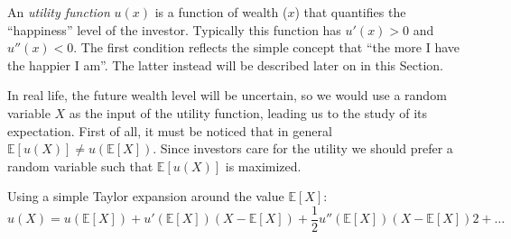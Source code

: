 %
%

%

An \emph{utility function} $u(x)$ is a function of wealth ($x$) that quantifies the ``happiness'' level of the investor. Typically this function has $u'(x) > 0$ and $u''(x) < 0$. The first condition reflects the simple concept that ``the more I have the happier I am''. The latter instead will be described later on in this Section.

In real life, the future wealth level will be uncertain, so we would use a random variable $X$ as the input of the utility function, leading us to the study of its expectation. First of all, it must be noticed that in general $\mathbb{E}[u(X)] \neq u(\mathbb{E}[X])$.
Since investors care for the utility we should prefer a random variable such that $\mathbb{E}[u(X)]$ is maximized.

Using a simple Taylor expansion around the value $\mathbb{E}[X]$:
\begin{equation*}
u(X) = u (\mathbb{E}[X]) + u'(\mathbb{E}[X]) (X - \mathbb{E}[X]) + \frac{1}{2}u''(\mathbb{E}[X]) (X - \mathbb{E}[X])2 + \ldots
\end{equation*}

